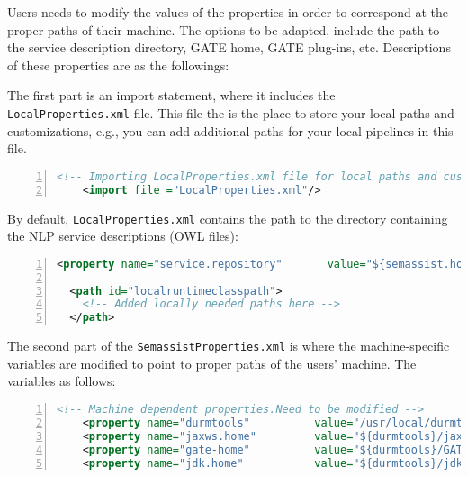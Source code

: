 Users needs to modify the values of the properties in order to
correspond at the proper paths of their machine. The options to be
adapted, include the path to the service description directory, GATE
home, GATE plug-ins, etc. Descriptions of these properties are as the
followings:

The first part is an import statement, where it includes the
\texttt{LocalProperties.xml} file. This file the is the place to store
your local paths and customizations, e.g., you can add additional paths
for your local pipelines in this file.
\begin{lstlisting}[language=XML,numbers=left,xleftmargin=8mm,columns=flexible]
    <!-- Importing LocalProperties.xml file for local paths and customizations -->
    <import file ="LocalProperties.xml"/>
\end{lstlisting}
By default, \texttt{LocalProperties.xml} contains the path to the directory containing the NLP
service descriptions (OWL files):
\begin{lstlisting}[language=XML,numbers=left,xleftmargin=8mm,columns=flexible]
  <property name="service.repository"       value="${semassist.home}/Resources/OwlServiceDescriptions/"/>

  <path id="localruntimeclasspath">
    <!-- Added locally needed paths here -->
  </path>
\end{lstlisting}


The second part of the \texttt{SemassistProperties.xml} is where the
machine-specific variables are modified to point to proper paths of
the users' machine. The variables as follows:
\begin{lstlisting}[language=XML,numbers=left,xleftmargin=8mm,columns=flexible]
    <!-- Machine dependent properties.Need to be modified -->
    <property name="durmtools"          value="/usr/local/durmtools" />
    <property name="jaxws.home"         value="${durmtools}/jaxws-ri" />
    <property name="gate-home"          value="${durmtools}/GATE/gate" />
    <property name="jdk.home"           value="${durmtools}/jdk" />
\end{lstlisting}

